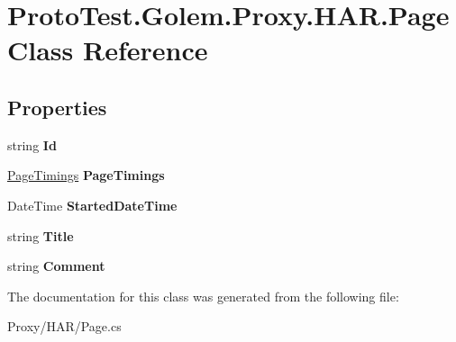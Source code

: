 \hypertarget{class_proto_test_1_1_golem_1_1_proxy_1_1_h_a_r_1_1_page}{\section{Proto\-Test.\-Golem.\-Proxy.\-H\-A\-R.\-Page Class Reference}
\label{class_proto_test_1_1_golem_1_1_proxy_1_1_h_a_r_1_1_page}
}
\subsection*{Properties}
\begin{DoxyCompactItemize}
\item 
\hypertarget{class_proto_test_1_1_golem_1_1_proxy_1_1_h_a_r_1_1_page_a4a568bbef8f01f85904d7823e148386c}{string {\bfseries Id}}\label{class_proto_test_1_1_golem_1_1_proxy_1_1_h_a_r_1_1_page_a4a568bbef8f01f85904d7823e148386c}

\item 
\hypertarget{class_proto_test_1_1_golem_1_1_proxy_1_1_h_a_r_1_1_page_a7bb8d2532537162e39e2e80480ee59a5}{\hyperlink{class_proto_test_1_1_golem_1_1_proxy_1_1_h_a_r_1_1_page_timings}{Page\-Timings} {\bfseries Page\-Timings}}\label{class_proto_test_1_1_golem_1_1_proxy_1_1_h_a_r_1_1_page_a7bb8d2532537162e39e2e80480ee59a5}

\item 
\hypertarget{class_proto_test_1_1_golem_1_1_proxy_1_1_h_a_r_1_1_page_a1b256fc519cc323ca18f41004fcf2ea6}{Date\-Time {\bfseries Started\-Date\-Time}}\label{class_proto_test_1_1_golem_1_1_proxy_1_1_h_a_r_1_1_page_a1b256fc519cc323ca18f41004fcf2ea6}

\item 
\hypertarget{class_proto_test_1_1_golem_1_1_proxy_1_1_h_a_r_1_1_page_a1e47599519e61e4c6424a21a81783ea8}{string {\bfseries Title}}\label{class_proto_test_1_1_golem_1_1_proxy_1_1_h_a_r_1_1_page_a1e47599519e61e4c6424a21a81783ea8}

\item 
\hypertarget{class_proto_test_1_1_golem_1_1_proxy_1_1_h_a_r_1_1_page_a6040a72fc1addef9818ebb7722addbc8}{string {\bfseries Comment}}\label{class_proto_test_1_1_golem_1_1_proxy_1_1_h_a_r_1_1_page_a6040a72fc1addef9818ebb7722addbc8}

\end{DoxyCompactItemize}


The documentation for this class was generated from the following file\-:\begin{DoxyCompactItemize}
\item 
Proxy/\-H\-A\-R/Page.\-cs\end{DoxyCompactItemize}

